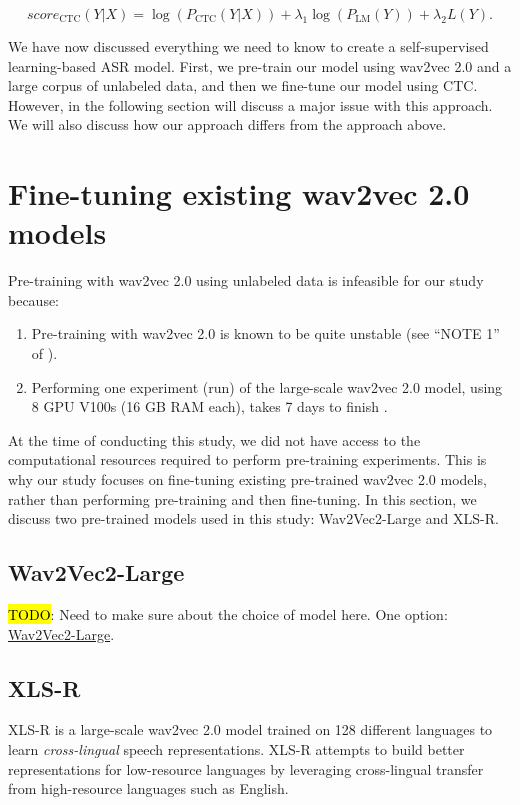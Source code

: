 \begin{equation}
    \textit{score}_{\text{CTC}}(Y|X) = \log\left(P_{\text{CTC}}(Y|X)\right) + \lambda_1 \log\left(P_{\text{LM}}(Y)\right) + \lambda_2 L(Y).
\end{equation}

We have now discussed everything we need to know to create a self-supervised learning-based ASR model. 
First, we pre-train our model using wav2vec 2.0 and a large corpus of unlabeled data, 
and then we fine-tune our model using CTC.
However, in the following section will discuss a major issue with this approach.
We will also discuss how our approach differs from the approach above.



\section{Fine-tuning existing wav2vec 2.0 models}
Pre-training with wav2vec 2.0 using unlabeled data is infeasible for our study because:
\begin{enumerate}
    \item Pre-training with wav2vec 2.0 is known to be quite unstable (see ``NOTE 1'' of \cite{vonplaten2021pretraining}).
    \item Performing one experiment (run) of the large-scale wav2vec 2.0 model, using 8 GPU V100s (16 GB RAM each), takes 7 days to finish \cite{vonplaten2021pretraining}.
\end{enumerate}
At the time of conducting this study, we did not have access to the computational resources required to perform pre-training experiments.
This is why our study focuses on fine-tuning existing pre-trained wav2vec 2.0 models, rather than performing pre-training and then fine-tuning.
In this section, we discuss two pre-trained models used in this study: Wav2Vec2-Large and XLS-R.

\subsection{Wav2Vec2-Large}
\hl{TODO}: Need to make sure about the choice of model here. One option: \href{https://huggingface.co/facebook/wav2vec2-large}{Wav2Vec2-Large}.

\subsection{XLS-R}
XLS-R \cite{babu2021xls} is a large-scale wav2vec 2.0 model trained on 128 different languages to learn \emph{cross-lingual} speech representations.
XLS-R attempts to build better representations for low-resource languages by leveraging cross-lingual transfer from high-resource languages such as English.

